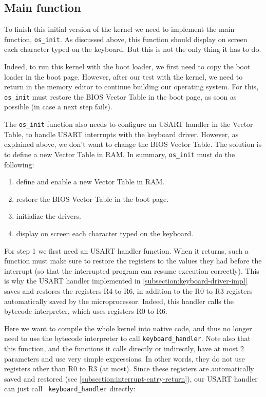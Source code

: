 
\subsection{Main function}\label{subsection:kernel0-main}

To finish this initial version of the kernel we need to implement the main
function, {\tt os\_init}. As discussed above, this function should display on
screen each character typed on the keyboard. But this is not the only thing it
has to do.

Indeed, to run this kernel with the boot loader, we first need to
copy the boot loader in the boot page. However, after our test with the
kernel, we need to return in the memory editor to continue building our
operating system. For this, {\tt os\_init} must restore the BIOS Vector Table
in the boot page, as soon as possible (in case a next step fails).

The {\tt os\_init} function also needs to configure an USART handler in the
Vector Table, to handle USART interrupts with the keyboard driver. However, as
explained above, we don't want to change the BIOS Vector Table. The solution is
to define a new Vector Table in RAM. In summary, {\tt os\_init} must do the
following:
\begin{enumerate}
  \item define and enable a new Vector Table in RAM.

  \item restore the BIOS Vector Table in the boot page.

  \item initialize the drivers.

  \item display on screen each character typed on the keyboard.
\end{enumerate}

For step 1 we first need an USART handler function. When it returns, such a
function must make sure to restore the registers to the values they had before
the interrupt (so that the interrupted program can resume execution correctly).
This is why the USART handler implemented in
\cref{subsection:keyboard-driver-impl} saves and restores the registers R4 to
R6, in addition to the R0 to R3 registers automatically saved by the
microprocessor. Indeed, this handler calls the bytecode interpreter, which uses
registers R0 to R6.

Here we want to compile the whole kernel into native code, and thus no longer
need to use the bytecode interpreter to call {\tt keyboard\_handler}. Note also
that this function, and the functions it calls directly or indirectly, have at
most 2 parameters and use very simple expressions. In other words, they do not
use registers other than R0 to R3 (at most). Since these registers are
automatically saved and restored (see
\cref{subsection:interrupt-entry-return}), our USART handler can just call {\tt
keyboard\_handler} directly:

